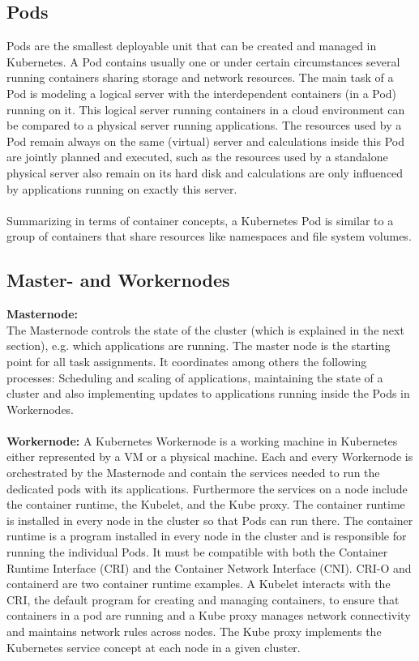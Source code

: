 \subsection{Pods}
Pods are the smallest deployable unit that can be created and managed in Kubernetes. A Pod contains usually one or under certain circumstances several running containers sharing storage and network resources. The main task of a Pod is modeling a logical server with the interdependent containers (in a Pod) running on it. This logical server running containers in a cloud environment can be compared to a physical server running applications. The resources used by a Pod remain always on the same (virtual) server and calculations inside this Pod are jointly planned and executed, such as the resources used by a standalone physical server also remain on its hard disk and calculations are only influenced by applications running on exactly this server.
\\\\Summarizing in terms of container concepts, a Kubernetes Pod is similar to a group of containers that share resources like namespaces and file system volumes.\cite{Kubernetes_pods:2022}
\newpage\subsection{Master- and Workernodes}
\textbf{Masternode:}
\\The Masternode controls the state of the cluster (which is explained in the next section), e.g. which applications are running. The master node is the starting point for all task assignments. It coordinates among others the following processes: Scheduling and scaling of applications, maintaining the state of a cluster and also implementing updates to applications running inside the Pods in Workernodes.\cite{Kubernetes_cluster}
\\\\\textbf{Workernode:}
A Kubernetes Workernode is a working machine in Kubernetes either represented by a VM or a physical machine. Each and every Workernode is orchestrated by the Masternode and contain the services needed to run the dedicated pods with its applications.  Furthermore the services on a node include the container runtime, the Kubelet, and the Kube proxy. The container runtime is installed in every node in the cluster so that Pods can run there. 
The container runtime is a program installed in every node in the cluster and is responsible for running the individual Pods. It must be compatible with both the Container Runtime Interface (CRI) and the Container Network Interface (CNI). CRI-O and containerd are two container runtime examples. A Kubelet interacts with the CRI, the default program for creating and managing containers, to ensure that containers in a pod are running and a Kube proxy manages network connectivity and maintains network rules across nodes. The Kube proxy implements the Kubernetes service concept at each node in a given cluster.\cite{Kubernetes_cluster, Kubernetes_nodes:2021, Kubernetes_runtime:2022}
